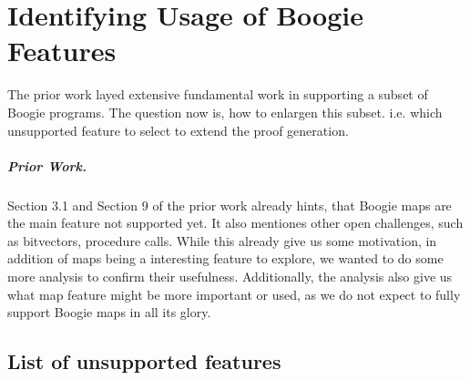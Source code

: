 \chapter{Identifying Usage of Boogie Features}
\label{sec:unsupported-usage}

The prior work layed extensive fundamental work in supporting a subset of Boogie programs.
The question now is, how to enlargen this subset. i.e. which unsupported feature to select
to extend the proof generation.

\paragraph{Prior Work.} Section 3.1 and Section 9 of the prior work \cite{parthasarathy2021formally} already hints,
that Boogie maps are the main feature not supported yet.
It also mentiones other open challenges, such as bitvectors, procedure calls.
While this already give us some motivation, in addition of maps being a interesting feature to explore,
we wanted to do some more analysis to confirm their usefulness.
Additionally, the analysis also give us what map feature might be more important or used,
as we do not expect to fully support Boogie maps in all its glory.




\section{List of unsupported features}

